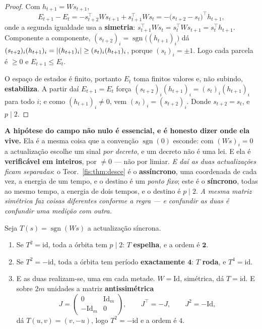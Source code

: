 \documentclass[livro.tex]{subfiles}
\begin{document}
\begin{proof}
Com $h_{t+1}=Ws_{t+1}$,
\[
E_{t+1}-E_t=-s_{t+2}^{\!\top}Ws_{t+1}+s_{t+1}^{\!\top}Ws_t
=-\bigl(s_{t+2}-s_t\bigr)^{\!\top}h_{t+1},
\]
onde a segunda igualdade usa a \textbf{simetria}:
$s_{t+1}^{\!\top}Ws_t=s_t^{\!\top}Ws_{t+1}=s_t^{\!\top}h_{t+1}$. Componente a
componente, $(s_{t+2})_i=\operatorname{sgn}\bigl((h_{t+1})_i\bigr)$ dá
$(s_{t+2})_i(h_{t+1})_i=\lvert (h_{t+1})_i\rvert\ge(s_t)_i(h_{t+1})_i$, porque
$(s_t)_i=\pm1$. Logo cada parcela é $\ge0$ e $E_{t+1}\le E_t$.

O espaço de estados é finito, portanto $E_t$ toma finitos valores e, não subindo,
\textbf{estabiliza}. A partir daí $E_{t+1}=E_t$ força
$(s_{t+2})_i(h_{t+1})_i=(s_t)_i(h_{t+1})_i$ para todo $i$; e como
$(h_{t+1})_i\neq0$, vem $(s_t)_i=(s_{t+2})_i$. Donde $s_{t+2}=s_t$, e $p\mid2$.
\end{proof}

\medskip\noindent\textbf{A hipótese do campo não nulo é essencial, e é honesto
dizer onde ela vive.} Ela é a mesma coisa que a convenção $\operatorname{sgn}(0)$
esconde: com $(Ws)_i=0$ a actualização escolhe um sinal \emph{por decreto}, e um
decreto não é uma lei. E ela é \textbf{verificável em inteiros}, por $\neq0$ ---
não por limiar. \emph{E daí as duas actualizações ficam separadas}: o
Teor.~\ref{fis:thm:desce} é o \textbf{assíncrono}, uma coordenada de cada vez, a
energia de um tempo, e o destino é um \emph{ponto fixo}; este é o
\textbf{síncrono}, todas ao mesmo tempo, a energia de dois tempos, e o destino é
$p\mid2$. \emph{A mesma matriz simétrica faz coisas diferentes conforme a regra
--- e confundir as duas é confundir uma medição com outra.}

\begin{teorema}\label{fis:thm:duasordens}
Seja $T(s)=\operatorname{sgn}(Ws)$ a actualização síncrona.
\begin{enumerate}\itemsep3pt
\item[(1)] Se $T^{2}=\mathrm{id}$, toda a órbita tem $p\mid2$: $T$
\textbf{espelha}, e a ordem é $\mathbf{2}$.
\item[(2)] Se $T^{2}=-\mathrm{id}$, toda a órbita tem período \textbf{exactamente
$\mathbf{4}$}: $T$ \textbf{roda}, e $T^{4}=\mathrm{id}$.
\item[(3)] E as duas realizam-se, uma em cada metade. $W=\mathrm{Id}$, simétrica,
dá $T=\mathrm{id}$. E sobre $2m$ unidades a matriz \textbf{antissimétrica}
\[
J=\begin{pmatrix}0&\mathrm{Id}_m\\[2pt]-\mathrm{Id}_m&0\end{pmatrix},
\qquad J^{\!\top}=-J,\qquad J^{2}=-\mathrm{Id},
\]
dá $T(u,v)=(v,-u)$, logo $T^{2}=-\mathrm{id}$ e a ordem é $4$.
\end{enumerate}
\end{teorema}
\end{document}

